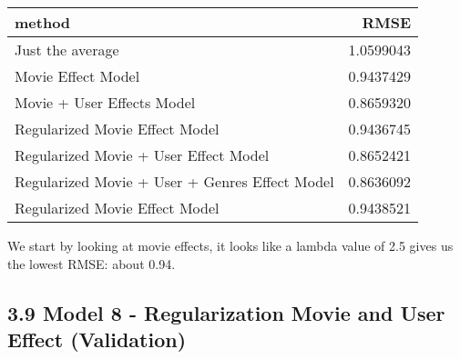 \documentclass[]{article}
\begin{document}
\begin{longtable}[]{@{}lr@{}}
\toprule
method & RMSE\tabularnewline
\midrule
\endhead
Just the average & 1.0599043\tabularnewline
Movie Effect Model & 0.9437429\tabularnewline
Movie + User Effects Model & 0.8659320\tabularnewline
Regularized Movie Effect Model & 0.9436745\tabularnewline
Regularized Movie + User Effect Model & 0.8652421\tabularnewline
Regularized Movie + User + Genres Effect Model &
0.8636092\tabularnewline
Regularized Movie Effect Model & 0.9438521\tabularnewline
\bottomrule
\end{longtable}

We start by looking at movie effects, it looks like a lambda value of
2.5 gives us the lowest RMSE: about 0.94.

\hypertarget{model-8---regularization-movie-and-user-effect-validation-1}{%
\subsection{3.9 Model 8 - Regularization Movie and User Effect
(Validation)}\label{model-8---regularization-movie-and-user-effect-validation-1}}
\end{document}
